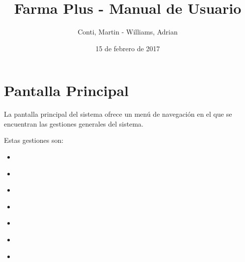 \documentclass[a4paper,10pt,spanish]{sphinxmanual}
\title{Farma Plus - Manual de Usuario}
\date{15 de febrero de 2017}
\author{Conti, Martin - Williams, Adrian}
\begin{document}
\maketitle
\tableofcontents
{}\label{index::doc}



\chapter{Pantalla Principal}
\label{pantallaprincipal::doc}\label{pantallaprincipal:farma-plus}\label{pantallaprincipal:pantalla-principal}
La pantalla principal del sistema ofrece un menú de navegación en el que se encuentran las gestiones generales del sistema.


Estas gestiones son:
\begin{itemize}
\item {} 
{\hyperref[pantallaprincipal:gestion\string-usuarios]{}}

\item {} 
{\hyperref[pantallaprincipal:gestion\string-medicamentos]{}}

\item {} 
{\hyperref[pantallaprincipal:gestion\string-organizaciones]{}}

\item {} 
{\hyperref[pantallaprincipal:gestion\string-pedidos]{}}

\item {} 
{\hyperref[pantallaprincipal:gestion\string-facturacion]{}}

\item {} 
{\hyperref[pantallaprincipal:gestion\string-stockdistribuido]{}}

\item {} 
{\hyperref[pantallaprincipal:gestion\string-informeventas]{}}

\end{itemize}
\end{document}
